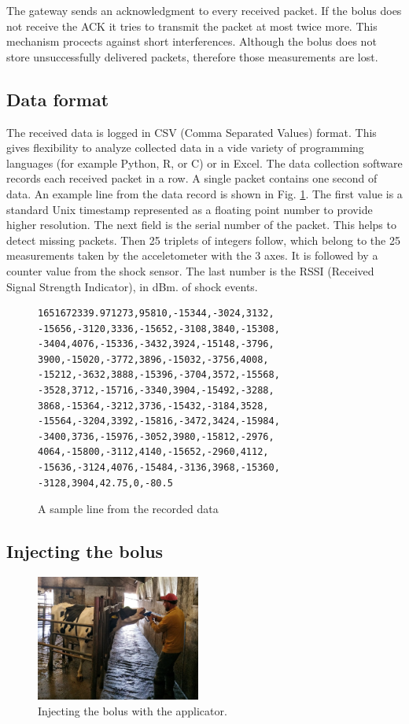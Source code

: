 \documentclass[conference]{IEEEtran}
\begin{document}
The gateway sends an acknowledgment to every received packet. If the bolus
does not receive the ACK it tries to transmit the packet at most twice more.
This mechanism procects against short interferences. Although the bolus does
not store unsuccessfully delivered packets, therefore those measurements are
lost.

\subsection{Data format}

The received data is logged in CSV (Comma Separated Values) format. This gives
flexibility to analyze collected data in a vide variety of programming languages
(for example Python, R, or C) or in Excel. The data collection software records
each received packet in a row. A single packet contains one second of data.
An example line from the data record is shown in Fig. \ref{csv-sample}. The first
value is a standard Unix timestamp represented as a floating point number to provide
higher resolution. The next field is the serial number of the packet. This helps to
detect missing packets. Then 25 triplets of integers follow, which belong to the
25 measurements taken by the acceletometer with the 3 axes. It is followed by
a counter value from the shock sensor. The last number is the RSSI (Received
Signal Strength Indicator), in dBm.
of shock events.

\begin{figure}[htbp]
\begin{verbatim}
1651672339.971273,95810,-15344,-3024,3132,
-15656,-3120,3336,-15652,-3108,3840,-15308,
-3404,4076,-15336,-3432,3924,-15148,-3796,
3900,-15020,-3772,3896,-15032,-3756,4008,
-15212,-3632,3888,-15396,-3704,3572,-15568,
-3528,3712,-15716,-3340,3904,-15492,-3288,
3868,-15364,-3212,3736,-15432,-3184,3528,
-15564,-3204,3392,-15816,-3472,3424,-15984,
-3400,3736,-15976,-3052,3980,-15812,-2976,
4064,-15800,-3112,4140,-15652,-2960,4112,
-15636,-3124,4076,-15484,-3136,3968,-15360,
-3128,3904,42.75,0,-80.5
\end{verbatim}
\caption{A sample line from the recorded data}
\label{csv-sample}
\end{figure}


\subsection{Injecting the bolus}

\begin{figure}[htbp]
  \centerline{\includegraphics[width=0.48\textwidth]{fig/bolus_application.jpg}}
  \caption{Injecting the bolus with the applicator.}
  \label{bolus-injecting}
\end{figure}
\end{document}

